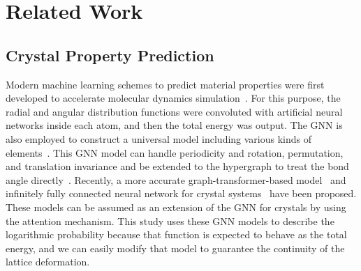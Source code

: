 \section{Related Work}
\subsection{Crystal Property Prediction}
Modern machine learning schemes to predict material properties were first developed to accelerate molecular dynamics simulation~\cite{PhysRevLett.98.146401}.
For this purpose, the radial and angular distribution functions were convoluted with artificial neural networks inside each atom, and then the total energy was output.
The GNN is also employed to construct a universal model including various kinds of elements~\cite{CGCNN,SchNet,MEGNet,PotNet}.
This GNN model can handle periodicity and rotation, permutation, and translation invariance and be extended to the hypergraph to treat the bond angle directly~\cite{ALIGNN}.
Recently, a more accurate graph-transformer-based model~\cite{Matformer} and infinitely fully connected neural network for crystal systems~\cite{Crystalformer} have been proposed.
These models can be assumed as an extension of the GNN for crystals by using the attention mechanism.
This study uses these GNN models to describe the logarithmic probability because that function is expected to behave as the total energy, and we can easily modify that model to guarantee the continuity of the lattice deformation.

